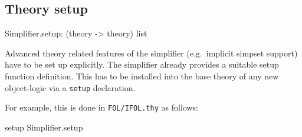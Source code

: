\subsection{Theory setup}
\begin{ttbox}
Simplifier.setup: (theory -> theory) list
\end{ttbox}

Advanced theory related features of the simplifier (e.g.\ implicit
simpset support) have to be set up explicitly.  The simplifier already
provides a suitable setup function definition.  This has to be
installed into the base theory of any new object-logic via a
\texttt{setup} declaration.

For example, this is done in \texttt{FOL/IFOL.thy} as follows:
\begin{ttbox}
setup Simplifier.setup
\end{ttbox}




